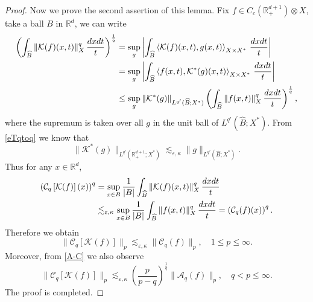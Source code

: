 \documentclass[oneside,english,a4wide]{amsart}
\numberwithin{equation}{section}
\numberwithin{figure}{section}
\theoremstyle{plain}
\theoremstyle{plain}
\theoremstyle{definition}
\theoremstyle{plain}
\theoremstyle{remark}
\theoremstyle{definition}
\theoremstyle{remark}
\theoremstyle{definition}
\newcommand{\real}{{\mathbb R}}
\newcommand{\A}{{\mathcal A}}
\newcommand{\M}{{\mathcal M}}
\newcommand{\e}{\varepsilon}
\newcommand{\8}{+\infty}
\renewcommand{\1}{\mathbbm{1}}
\newcommand{\wh}{\widehat}
\newcommand{\K}{{\mathcal K}}
\newcommand\jdz[1]{ \left| #1 \right| }
\newcommand\sk[1]{ \left( #1 \right) }
\newcommand\mk[1]{ \left[ #1 \right] }
\newcommand{\lara}[1]{\left\langle #1 \right\rangle}
\renewcommand\d{{\rm d}}
\begin{document}
{\begin{proof}
Now we prove the second assertion of this lemma. Fix $f \in C_c(\real^{d+1}_+)\otimes X$, take a ball $B$ in $\real^d$, we can write
\[
\begin{aligned}
    \sk{\int_{\wh{B}} \| \K(f)(x, t) \|_X^q \,\frac{\d x\d t}{t}}^{\frac{1}{q}} & = \sup_{g} \jdz{\int_{\wh{B}} \lara{ \K(f)(x, t), g(x, t) }_{X \times X^*} \,\frac{\d x\d t}{t} }\\
    & = \sup_{g}\jdz{ \int_{\wh{B}} \lara{ f(x, t), \K^*(g)(x, t) }_{X \times X^*} \,\frac{\d x\d t}{t}} \\
    & \leq \sup_g \| \K^*(g%
) \|_{L^{q'}(\wh{B}; X^*)} \sk{ \int_{\wh{B}} \| f(x, t) \|_X^q \,\frac{\d x\d t}{t} }^{\frac{1}{q}},
\end{aligned}
\]
where the supremum is taken over all $g$ in the unit ball of $L^{q'}(\wh{B}; X^*)$. From \eqref{eTqtoq} we know that
\[
    \|\K^*(g) \|_{L^{q'}(\real^{d+1}_+; X^*)} \lesssim_{\e, \kappa} \| g \|_{L^{q'}(\wh{B}; X^*)}. 
\]
Thus for any $x \in \real^d$,
\[
\begin{aligned}
    \sk{ \mathcal{C}_q\mk{\K(f)}(x) }^q & = \sup_{x \in B} \frac{1}{|B|} \int_{\wh{B}} \| \K(f)(x, t) \|_X^q \,\frac{\d x\d t}{t} \\
    & \lesssim_{\e, \kappa} \sup_{x \in B} \frac{1}{|B|}\int_{\wh{B}} \| f(x, t) \|_X^q \,\frac{\d x\d t}{t} = \sk{ \mathcal{C}_q(f)(x) }^q.
\end{aligned}
\]
Therefore we obtain
\[
    \| \mathcal{C}_q\mk{\K(f)} \|_p \lesssim_{\e, \kappa} \| \mathcal{C}_q\sk{f} \|_p, \quad 1 \leq p \leq \infty.
\]
Moreover, from \eqref{A-C} we also observe
\[
    \| \mathcal{C}_{q}\mk{\K(f)} \|_{p}  \lesssim_{\e, \kappa} \sk{\frac{p}{p-q}}^{\frac{1}{q}} \| \A_{q}(f) \|_{p}, \quad q < p \leq \infty.
\]
The proof is completed.
\end{proof}

}
\end{document}
